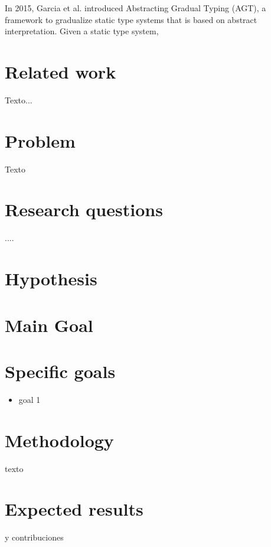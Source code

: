 \documentclass[submission]{eptcs}
\begin{document}
In 2015, Garcia et al. \cite{10.1145/2914770.2837670} introduced Abstracting Gradual Typing (AGT), a framework to gradualize static type systems that is based on abstract interpretation.
Given a static type system, 

\section{Related work}

Texto...

\section{Problem}

Texto 

\section{Research questions}

....

\section{Hypothesis}


\section{Main Goal}


\section{Specific goals}

\begin{itemize}
\item goal 1
\end{itemize}

\section{Methodology}

texto

\section{Expected results}

 y contribuciones

\nocite{*}


\end{document}
